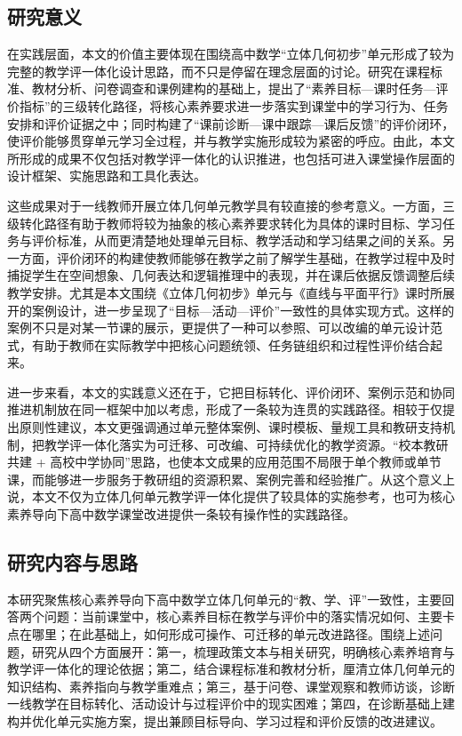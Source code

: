 \documentclass[UTF8,a4paper,12pt,twoside]{ctexart}
\begin{document}
\subsection{研究意义}
在实践层面，本文的价值主要体现在围绕高中数学“立体几何初步”单元形成了较为完整的教学评一体化设计思路，而不只是停留在理念层面的讨论。研究在课程标准、教材分析、问卷调查和课例建构的基础上，提出了“素养目标—课时任务—评价指标”的三级转化路径，将核心素养要求进一步落实到课堂中的学习行为、任务安排和评价证据之中；同时构建了“课前诊断—课中跟踪—课后反馈”的评价闭环，使评价能够贯穿单元学习全过程，并与教学实施形成较为紧密的呼应。由此，本文所形成的成果不仅包括对教学评一体化的认识推进，也包括可进入课堂操作层面的设计框架、实施思路和工具化表达。

这些成果对于一线教师开展立体几何单元教学具有较直接的参考意义。一方面，三级转化路径有助于教师将较为抽象的核心素养要求转化为具体的课时目标、学习任务与评价标准，从而更清楚地处理单元目标、教学活动和学习结果之间的关系。另一方面，评价闭环的构建使教师能够在教学之前了解学生基础，在教学过程中及时捕捉学生在空间想象、几何表达和逻辑推理中的表现，并在课后依据反馈调整后续教学安排。尤其是本文围绕《立体几何初步》单元与《直线与平面平行》课时所展开的案例设计，进一步呈现了“目标—活动—评价”一致性的具体实现方式。这样的案例不只是对某一节课的展示，更提供了一种可以参照、可以改编的单元设计范式，有助于教师在实际教学中把核心问题统领、任务链组织和过程性评价结合起来。

进一步来看，本文的实践意义还在于，它把目标转化、评价闭环、案例示范和协同推进机制放在同一框架中加以考虑，形成了一条较为连贯的实践路径。相较于仅提出原则性建议，本文更强调通过单元整体案例、课时模板、量规工具和教研支持机制，把教学评一体化落实为可迁移、可改编、可持续优化的教学资源。“校本教研共建 + 高校中学协同”思路，也使本文成果的应用范围不局限于单个教师或单节课，而能够进一步服务于教研组的资源积累、案例完善和经验推广。从这个意义上说，本文不仅为立体几何单元教学评一体化提供了较具体的实施参考，也可为核心素养导向下高中数学课堂改进提供一条较有操作性的实践路径。

\subsection{研究内容与思路}
本研究聚焦核心素养导向下高中数学立体几何单元的“教、学、评”一致性，主要回答两个问题：当前课堂中，核心素养目标在教学与评价中的落实情况如何、主要卡点在哪里；在此基础上，如何形成可操作、可迁移的单元改进路径。围绕上述问题，研究从四个方面展开：第一，梳理政策文本与相关研究，明确核心素养培育与教学评一体化的理论依据；第二，结合课程标准和教材分析，厘清立体几何单元的知识结构、素养指向与教学重难点；第三，基于问卷、课堂观察和教师访谈，诊断一线教学在目标转化、活动设计与过程评价中的现实困难；第四，在诊断基础上建构并优化单元实施方案，提出兼顾目标导向、学习过程和评价反馈的改进建议。
\end{document}
